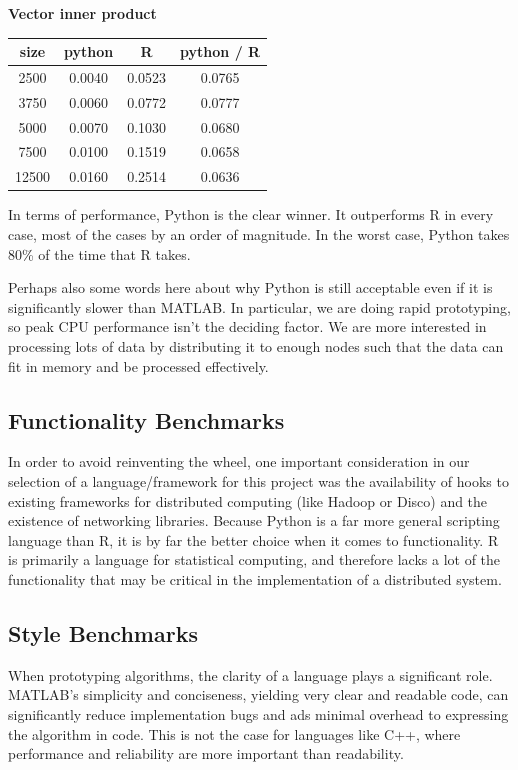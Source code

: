 \documentclass[%
        final,
        notitlepage,
        narroweqnarray,
        inline,
        ]{ieee}
\begin{document}
\begin{center}
\vspace{1em}
\textbf{Vector inner product} \\
\begin{tabular}{cccc}
size  & python  &  R       & python / R \\
  \hline
2500  & 0.0040 & 0.0523 & 0.0765 \\
3750  & 0.0060 & 0.0772 & 0.0777 \\
5000  & 0.0070 & 0.1030 & 0.0680 \\
7500  & 0.0100 & 0.1519 & 0.0658 \\
12500 & 0.0160 & 0.2514 & 0.0636 \\
\end{tabular}

\end{center}

In terms of performance, Python is the clear winner. It outperforms R in every
case, most of the cases by an order of magnitude. In the worst case, Python
takes 80\% of the time that R takes.

Perhaps also some words here about why Python is still acceptable even if it is
significantly slower than MATLAB. In particular, we are doing rapid
prototyping, so peak CPU performance isn't the deciding factor. We are more
interested in processing lots of data by distributing it to enough nodes such
that the data can fit in memory and be processed effectively.


\subsection{Functionality Benchmarks}

In order to avoid reinventing the wheel, one important consideration in our
selection of a language/framework for this project was the availability of hooks
to existing frameworks for distributed computing (like Hadoop or Disco) and the
existence of networking libraries. Because Python is a far more general
scripting language than R, it is by far the better choice when it comes to
functionality. R is primarily a language for statistical computing, and
therefore lacks a lot of the functionality that may be critical in the
implementation of a distributed system.

\subsection{Style Benchmarks}

When prototyping algorithms, the clarity of a language plays a significant role.
MATLAB's simplicity and conciseness, yielding very clear and readable code, can
significantly reduce implementation bugs and ads minimal overhead to expressing
the algorithm in code. This is not the case for languages like C++, where
performance and reliability are more important than readability.
\end{document}
